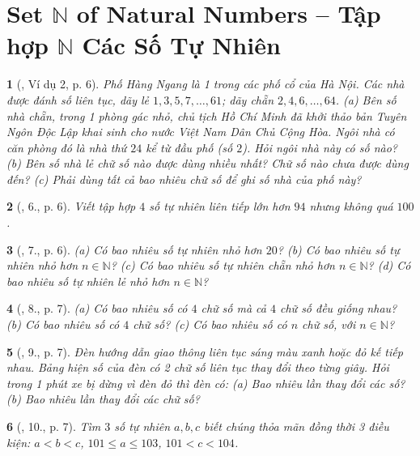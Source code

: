 \documentclass{article}
\newtheorem{baitoan}{}
\begin{document}

\section{Set $\mathbb{N}$ of Natural Numbers -- Tập hợp $\mathbb{N}$ Các Số Tự Nhiên}

\begin{baitoan}[\cite{Tuyen_Toan_6}, Ví dụ 2, p. 6]
	Phố Hàng Ngang là 1 trong các phố cổ của Hà Nội. Các nhà được đánh số liên tục, dãy lẻ $1,3,5,7,\ldots,61$; dãy chẵn $2,4,6,\ldots,64$. (a) Bên số nhà chẵn, trong 1 phòng gác nhỏ, chủ tịch Hồ Chí Minh đã khởi thảo bản Tuyên Ngôn Độc Lập khai sinh cho nước Việt Nam Dân Chủ Cộng Hòa. Ngôi nhà có căn phòng đó là nhà thứ $24$ kể từ đầu phố (số $2$). Hỏi ngôi nhà này có số nào? (b) Bên số nhà lẻ chữ số nào được dùng nhiều nhất? Chữ số nào chưa được dùng đến? (c) Phải dùng tất cả bao nhiêu chữ số để ghi số nhà của phố này?
\end{baitoan}

\begin{baitoan}[\cite{Tuyen_Toan_6}, 6., p. 6]
	Viết tập hợp $4$ số tự nhiên liên tiếp lớn hơn $94$ nhưng không quá $100$.
\end{baitoan}

\begin{baitoan}[\cite{Tuyen_Toan_6}, 7., p. 6]
	(a) Có bao nhiêu số tự nhiên nhỏ hơn $20$? (b) Có bao nhiêu số tự nhiên nhỏ hơn $n\in\mathbb{N}$? (c) Có bao nhiêu số tự nhiên chẵn nhỏ hơn $n\in\mathbb{N}$? (d) Có bao nhiêu số tự nhiên lẻ nhỏ hơn $n\in\mathbb{N}$?
\end{baitoan}

\begin{baitoan}[\cite{Tuyen_Toan_6}, 8., p. 7]
	(a) Có bao nhiêu số có $4$ chữ số mà cả $4$ chữ số đều giống nhau? (b) Có bao nhiêu số có $4$ chữ số? (c) Có bao nhiêu số có $n$ chữ số, với $n\in\mathbb{N}$?
\end{baitoan}

\begin{baitoan}[\cite{Tuyen_Toan_6}, 9., p. 7]
	Đèn hướng dẫn giao thông liên tục sáng màu xanh hoặc đỏ kế tiếp nhau. Bảng hiện số của đèn có 2 chữ số liên tục thay đổi theo từng giây. Hỏi trong 1 phút xe bị dừng vì đèn đỏ thì đèn có: (a) Bao nhiêu lần thay đổi các số? (b) Bao nhiêu lần thay đổi các chữ số?
\end{baitoan}

\begin{baitoan}[\cite{Tuyen_Toan_6}, 10., p. 7]
	Tìm $3$ số tự nhiên $a,b,c$ biết chúng thỏa mãn đồng thời 3 điều kiện: $a < b < c$, $101\le a\le103$, $101 < c < 104$.
\end{baitoan}
\end{document}
